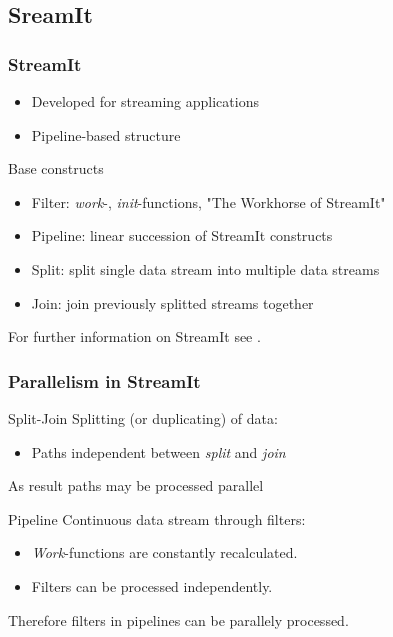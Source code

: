 \documentclass{beamer}
\begin{document}
\subsection{SreamIt}
\begin{frame}
\frametitle{StreamIt}
	\begin{itemize}
		\item Developed for streaming applications
		\item Pipeline-based structure
	\end{itemize}
	\begin{block}{Base constructs}
		\begin{itemize}
			\item Filter: \textit{work}-, \textit{init}-functions, "The Workhorse of StreamIt"
			\item Pipeline: linear succession of StreamIt constructs
			\item Split: split single data stream into multiple data streams
			\item Join: join previously splitted streams together
		\end{itemize}
	\end{block}
	For further information on StreamIt see \cite{streamIt}.
\end{frame}

\begin{frame}
\frametitle{Parallelism in StreamIt}
	\begin{block}{Split-Join}
		Splitting (or duplicating) of data:\\
		\begin{itemize}
			\item Paths independent between \textit{split} and \textit{join}
		\end{itemize}
		As result paths may be processed parallel
	\end{block}
	\begin{block}{Pipeline}
		Continuous data stream through filters:\\
		\begin{itemize}
			\item \textit{Work}-functions are constantly recalculated.
			\item Filters can be processed independently.
		\end{itemize}
		Therefore filters in pipelines can be parallely processed.
	\end{block}
\end{frame}
\end{document}
